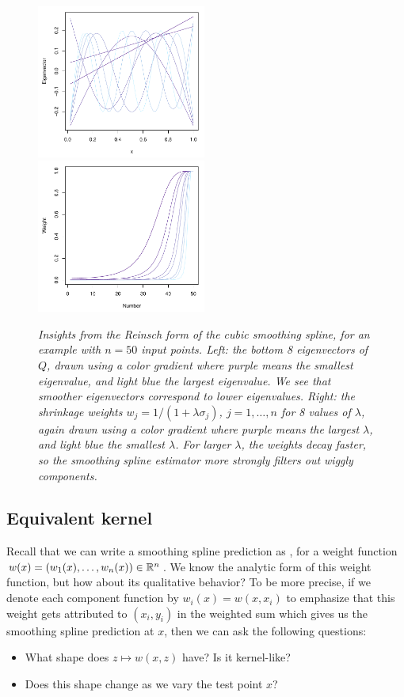 \documentclass{article}
\begin{document}
\begin{figure}[tbp]
\centering
\includegraphics[width=0.495\textwidth]{reinsch_basis.pdf}
\includegraphics[width=0.495\textwidth]{reinsch_weight.pdf}
\caption{\it Insights from the Reinsch form of the cubic smoothing spline, for
  an example with $n=50$ input points. Left: the bottom 8 eigenvectors of $Q$,
  drawn using a color gradient where purple means the smallest eigenvalue, and
  light blue the largest eigenvalue. We see that smoother eigenvectors
  correspond to lower eigenvalues. Right: the shrinkage weights
  $w_j=1/(1+\lambda \sigma_j)$, $j=1,\dots,n$ for 8 values of $\lambda$, again
  drawn using a color gradient where purple means the largest $\lambda$, and
  light blue the smallest $\lambda$. For larger $\lambda$, the weights decay
  faster, so the smoothing spline estimator more strongly filters out wiggly
  components.}         
\label{fig:reinsch}
\end{figure}

\subsection{Equivalent kernel}

Recall that we can write a smoothing spline prediction as , for a weight function  $w(x) = (w_1(x), \dots, w_n(x)) \in \mathbb{R}^n$.
We know the analytic form of this weight function, but how about its qualitative
behavior? To be more precise, if we denote each component function by $w_i(x) =
w(x, x_i)$ to emphasize that this weight gets attributed to $(x_i, y_i)$ in the
weighted sum  which gives us the
smoothing spline prediction at $x$, then we can ask the following questions:         
\begin{itemize}
\item What shape does $z \mapsto w(x, z)$ have? Is it kernel-like?
\item Does this shape change as we vary the test point $x$? 
\end{itemize}
\end{document}
